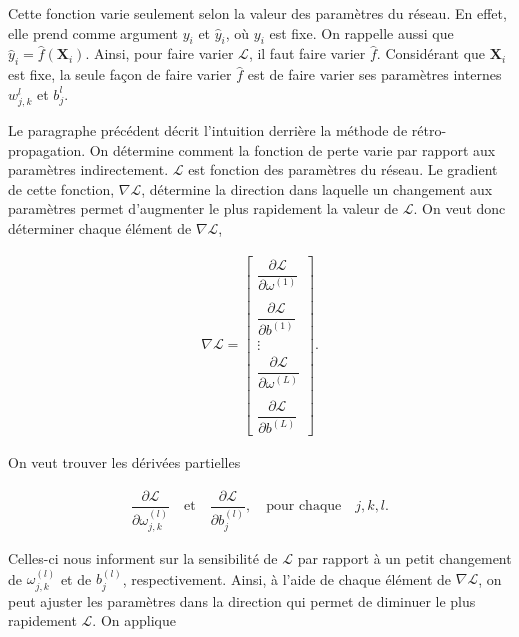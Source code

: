 Cette fonction varie seulement selon la valeur des paramètres du réseau. En effet, elle prend comme argument $ y_i$ et $\hat{y}_i$, où $y_i$ est fixe. On rappelle aussi que $\hat{y}_i=\hat{f}(\mathbf{X}_i)$. Ainsi, pour faire varier $\mathcal{L}$, il faut faire varier $\hat{f}$. Considérant que  $\mathbf{X}_i$ est fixe, la seule façon de faire varier 
$\hat{f}$ est de faire varier ses paramètres internes $w_{j,k}^l$ et $b_j^l$. 

Le paragraphe précédent décrit l'intuition derrière la méthode de rétro-propagation. On détermine comment la fonction de perte varie par rapport aux paramètres indirectement.  $\mathcal{L}$ est fonction des paramètres du réseau. Le gradient de cette fonction, $\nabla \mathcal{L}$, détermine la direction dans laquelle un changement aux paramètres permet d'augmenter le plus rapidement la valeur de $\mathcal{L}$. On veut donc déterminer chaque élément de $\nabla \mathcal{L}$,


\begin{align*}
\nabla \mathcal{L}= 
	\begin{bmatrix}
	\dfrac{\partial\mathcal{L}}{\partial \omega^{(1)}}\\
	\\
	\dfrac{\partial\mathcal{L}}{\partial b^{(1)}}\\
	\vdots \\
	\dfrac{\partial \mathcal{L}}{\partial \omega^{(L)}}\\
	\\
	\dfrac{\partial \mathcal{L}}{\partial b^{(L)}}
	\end{bmatrix}.
\end{align*}


On veut trouver les dérivées partielles

\begin{align*}
\dfrac{\partial\mathcal{L}}{\partial \omega^{(l)}_{j,k}} \quad \text{et} \quad \dfrac{\partial\mathcal{L}}{\partial b^{(l)}_{j}},\quad \text{pour chaque}\quad j,k,l.
\end{align*}

Celles-ci nous informent sur la sensibilité de $\mathcal{L}$ par rapport à un petit changement de $\omega^{(l)}_{j,k}$ et de $b^{(l)}_{j} $, respectivement. Ainsi, à l'aide de chaque élément de $\nabla \mathcal{L}$, on peut ajuster les paramètres dans la direction qui permet de diminuer le plus rapidement $\mathcal{L}$. On applique

